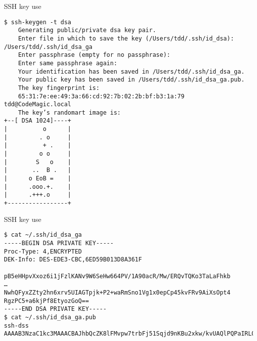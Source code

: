 \begin{frame}[fragile]{SSH key use}
\begin{verbatim}
$ ssh-keygen -t dsa
	Generating public/private dsa key pair.
	Enter file in which to save the key (/Users/tdd/.ssh/id_dsa): /Users/tdd/.ssh/id_dsa_ga
	Enter passphrase (empty for no passphrase):
	Enter same passphrase again:
	Your identification has been saved in /Users/tdd/.ssh/id_dsa_ga.
	Your public key has been saved in /Users/tdd/.ssh/id_dsa_ga.pub.
	The key fingerprint is:
	65:31:7e:ee:49:3a:66:cd:92:7b:02:2b:bf:b3:1a:79 tdd@CodeMagic.local
	The key’s randomart image is:
+--[ DSA 1024]----+
|          o      |
|         . o     |
|          + .    |
|         o o     |
|        S   o    |
|       ..  B .   |
|      o EoB =    |
|      .ooo.+.    |
|      .+++.o     |
+-----------------+
\end{verbatim}
\end{frame}

\begin{frame}[fragile]{SSH key use}
\begin{verbatim}
$ cat ~/.ssh/id_dsa_ga
-----BEGIN DSA PRIVATE KEY-----
Proc-Type: 4,ENCRYPTED
DEK-Info: DES-EDE3-CBC,6ED59B013D8A361F

pB5eHHpvXxoz6i1jFzlKANv9W6SeHw664PV/1A90acR/Mw/ERQvTQKo3TaLaFhkb
…
NwhQFyxZZty2hn6xrv5UIAGTpjk+P2+waRmSno1Vg1x0epCp45kvFRv9AiXsOpt4
RgzPC5+a6kjPf8EtyozGoQ==
-----END DSA PRIVATE KEY-----
$ cat ~/.ssh/id_dsa_ga.pub
ssh-dss AAAAB3NzaC1kc3MAAACBAJhbQcZK8lFMvpw7trbFj51Sqjd9nKBu2xkw/kvUAQlPQPaIRLOiq92fxp+
\end{verbatim}
\end{frame}

